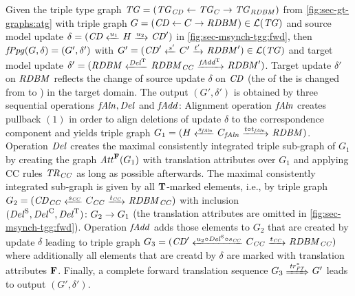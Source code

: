 \begin{remark}
Given the triple type graph $\mathit{TG}=(\mathit{TG}_\mathit{CD} \gets \mathit{TG}_C \to \mathit{TG}_\mathit{RDBM})$ from \cref{fig:sec-gt-graphs:atg} with triple graph $G=(\mathit{CD} \gets C \to \mathit{RDBM}) \in \mathcal{L}(\mathit{TG})$ and source model update $\delta=(\CD \transB{u_1} H \trans{u_2} \CD')$ in \cref{fig:sec-msynch-tgg:fwd}, then $\mathit{fPpg}(G,\delta)=(G',\delta')$ with $G'=(\CD' \transB{s'} C' \trans{t'} \RDBM') \in \Lang(\TG)$ and target model update $\delta'=(\RDBM \transB{\del^\T} \RDBM_\CC \trans{\fAdd^\T} \RDBM')$.
Target update $\delta'$ on $\mathit{RDBM}$ reflects the change of source update $\delta$ on $\mathit{CD}$ (the  of the  is changed from  to ) in the target domain.
The output $(G',\delta')$ is obtained by three sequential operations $\mathit{fAln},\mathit{Del}$ and $\mathit{fAdd}$:
Alignment operation $\mathit{fAln}$ creates pullback $(1)$ in order to align deletions of update $\delta$ to the correspondence component and yields triple graph $G_1=(H \transB{s_\fAln} C_\fAln \trans{t \circ t_\fAln} \RDBM)$.
Operation $\mathit{Del}$ creates the maximal consistently integrated triple sub-graph of $G_1$ by creating the graph $\mathit{Att}^\mathbf{F}(G_1)$ with translation attributes over $G_1$ and applying CC rules $\mathit{TR}_\mathit{CC}$ as long as possible afterwards.
The maximal consistently integrated sub-graph is given by all $\mathbf{T}$-marked elements, i.e., by triple graph $G_2=(\CD_\CC \transB{s_\CC} C_\CC \trans{t_\CC} \RDBM_\CC)$ with inclusion $(\mathit{Del}^\mathrm{S},\mathit{Del}^\mathrm{C},\mathit{Del}^\mathrm{T})\colon G_2 \to G_1$ (the translation attributes are omitted in \cref{fig:sec-msynch-tgg:fwd}).
Operation $\mathit{fAdd}$ adds those elements to $G_2$ that are created by update $\delta$ leading to triple graph $G_3=(\CD' \transB{u_2 \circ \del^\SRC \circ s_\CC} C_\CC \trans{t_\CC} \RDBM_\CC)$ where additionally all elements that are creatd by $\delta$ are marked with translation attributes $\mathbf{F}$.
Finally, a complete forward translation sequence $G_3 \Trans{\tr^*_\FT} G'$ leads to output $(G',\delta')$.
\envEndMarker
\end{remark}

